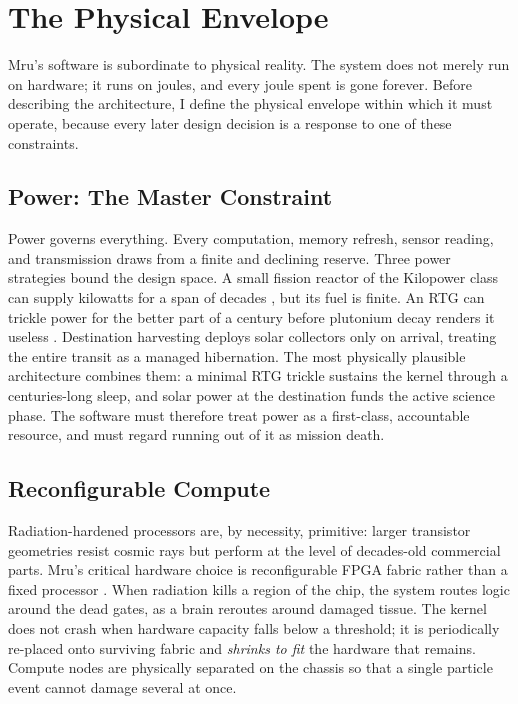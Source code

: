 \documentclass[10pt, a4paper]{article}
\begin{document}
\section{The Physical Envelope}

Mru's software is subordinate to physical reality. The system does not merely run on hardware; it runs on joules, and every joule spent is gone forever. Before describing the architecture, I define the physical envelope within which it must operate, because every later design decision is a response to one of these constraints.

\subsection{Power: The Master Constraint}

Power governs everything. Every computation, memory refresh, sensor reading, and transmission draws from a finite and declining reserve. Three power strategies bound the design space. A small fission reactor of the Kilopower class can supply kilowatts for a span of decades \cite{gibson2017, poston2020}, but its fuel is finite. An RTG can trickle power for the better part of a century before plutonium decay renders it useless \cite{bennett2006}. Destination harvesting deploys solar collectors only on arrival, treating the entire transit as a managed hibernation. The most physically plausible architecture combines them: a minimal RTG trickle sustains the kernel through a centuries-long sleep, and solar power at the destination funds the active science phase. The software must therefore treat power as a first-class, accountable resource, and must regard running out of it as mission death.

\subsection{Reconfigurable Compute}

Radiation-hardened processors are, by necessity, primitive: larger transistor geometries resist cosmic rays but perform at the level of decades-old commercial parts. Mru's critical hardware choice is reconfigurable FPGA fabric rather than a fixed processor \cite{wirthlin2015}. When radiation kills a region of the chip, the system routes logic around the dead gates, as a brain reroutes around damaged tissue. The kernel does not crash when hardware capacity falls below a threshold; it is periodically re-placed onto surviving fabric and \textit{shrinks to fit} the hardware that remains. Compute nodes are physically separated on the chassis so that a single particle event cannot damage several at once.
\end{document}

